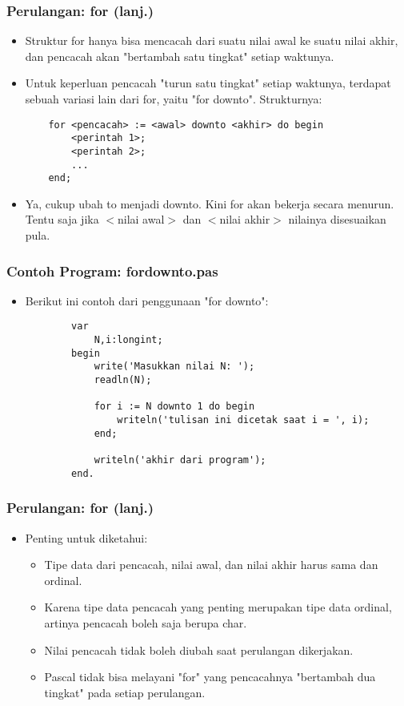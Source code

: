 \documentclass{beamer}
\begin{document}
\begin{frame}[fragile]
\frametitle{Perulangan: for (lanj.)}
\begin{itemize}
	\item Struktur for hanya bisa mencacah dari suatu nilai awal ke suatu nilai akhir, dan pencacah akan "bertambah satu tingkat" setiap waktunya.
	\item Untuk keperluan pencacah "turun satu tingkat" setiap waktunya, terdapat sebuah variasi lain dari for, yaitu "for downto". Strukturnya:
	\begin{lstlisting}
	for <pencacah> := <awal> downto <akhir> do begin
	    <perintah 1>;
	    <perintah 2>;
	    ...
	end;
	\end{lstlisting}
	\item Ya, cukup ubah \alert{to} menjadi \alert{downto}. Kini for akan bekerja secara menurun. Tentu saja jika $<$nilai awal$>$ dan $<$nilai akhir$>$ nilainya disesuaikan pula.
\end{itemize}
\end{frame}

\begin{frame}[fragile]
\frametitle{Contoh Program: fordownto.pas}
\begin{itemize}
	\item Berikut ini contoh dari penggunaan "for downto":
	\begin{lstlisting}
		var
		    N,i:longint;
		begin
		    write('Masukkan nilai N: ');
		    readln(N);
		
		    for i := N downto 1 do begin
		        writeln('tulisan ini dicetak saat i = ', i);
		    end;
		
		    writeln('akhir dari program');
		end.
	\end{lstlisting}
\end{itemize}
\end{frame}

\begin{frame}
\frametitle{Perulangan: for (lanj.)}
\begin{itemize}
	\item Penting untuk diketahui:
	\begin{itemize}
		\item Tipe data dari pencacah, nilai awal, dan nilai akhir harus sama dan \alert{ordinal}.
		\item Karena tipe data pencacah yang penting merupakan tipe data ordinal, artinya pencacah boleh saja berupa char.
		\item Nilai pencacah tidak boleh diubah saat perulangan dikerjakan.
		\item Pascal tidak bisa melayani "for" yang pencacahnya "bertambah dua tingkat" pada setiap perulangan.
	\end{itemize}
\end{itemize}
\end{frame}
\end{document}
